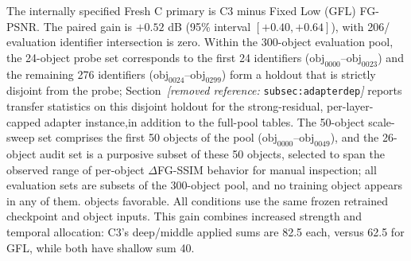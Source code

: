 \documentclass[times,twocolumn,final]{elsarticle}
\providecommand{\DIFadd}[1]{{\protect\color{blue} \sf #1}} %
\providecommand{\DIFdel}[1]{{\protect\color{red} \scriptsize #1}} %
\providecommand{\DIFaddbegin}{} %
\providecommand{\DIFaddend}{} %
\providecommand{\DIFdelbegin}{} %
\providecommand{\DIFdelend}{} %
\begin{document}
\DIFadd{The internally specified Fresh C primary is C3 minus Fixed Low (GFL) FG-PSNR. The paired gain is $+0.52$ dB (95\% interval $[+0.40,+0.64]$), with 206}\DIFaddend /\DIFdelbegin \DIFdel{evaluation identifier intersection is zero. Within the 300-object evaluation pool, the 24-object probe set corresponds to the first 24 identifiers ($\mathrm{obj}_{0000}$--$\mathrm{obj}_{0023}$) and the remaining 276 identifiers ($\mathrm{obj}_{0024}$--$\mathrm{obj}_{0299}$) form a holdout that is strictly disjoint from the probe; Section~\textit{[removed reference: }\texttt{subsec:adapterdep}\textit{]} reports transfer statistics on this disjoint holdout for the strong-residual, per-layer-capped adapter instance,in addition to the full-pool tables.
The 50-object scale-sweep set comprises the first 50 objects of the pool ($\mathrm{obj}_{0000}$--$\mathrm{obj}_{0049}$), and the 26-object audit set is a purposive subset of these 50 objects, selected to span the observed range of per-object $\Delta$FG-SSIM behavior for manual inspection; all evaluation sets are subsets of the 300-object pool, and no training object appears in any of them. }\DIFdelend \DIFaddbegin \DIFadd{300 objects favorable. All conditions use the same frozen retrained checkpoint and object inputs. This gain combines increased strength and temporal allocation: C3's deep/middle applied sums are 82.5 each, versus 62.5 for GFL, while both have shallow sum 40.
}\DIFaddend 
\end{document}
